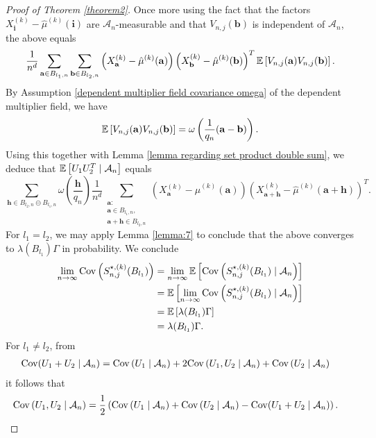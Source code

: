 \begin{proof}[Proof of Theorem \ref{theorem2}]
    Once more using the fact that the factors $X_{\mathbf{i}}^{(k)} - \hat{\mu}^{(k)}(\mathbf{i})$ are $\mathcal{A}_n$-measurable and that $V_{n, j}(\mathbf{b})$ is independent of $\mathcal{A}_n$, the above equals
    \[ \frac{1}{n^d} \sum\limits_{\mathbf{a} \in B_{l_1, n}} \sum\limits_{\mathbf{b} \in B_{l_2, n}} \left( X_\mathbf{a}^{(k)} - \hat{\mu}^{(k)}(\mathbf{a}) \right) \left( X_\mathbf{b}^{(k)} - \hat{\mu}^{(k)}(\mathbf{b}) \right)^T \mathbb{E}\left[ V_{n, j}(\mathbf{a}) V_{n, j}(\mathbf{b})\right]. \]
    By Assumption \eqref{dependent multiplier field covariance omega} of the dependent multiplier field, we have
    \[ \mathbb{E}\left[ V_{n, j}(\mathbf{a}) V_{n, j}(\mathbf{b})\right] = \omega\left(\frac{1}{q_n} (\mathbf{a} - \mathbf{b})\right). \]
    Using this together with Lemma \ref{lemma regarding set product double sum}, we deduce that $\mathbb{E}\left[U_1 U_2^T \mid \mathcal{A}_n\right]$ equals
    \[ \sum\limits_{\mathbf{h} \in B_{l_2, n} \circleddash B_{l_1, n}} \omega\left( \frac{\mathbf{h}}{q_n}\right) \frac{1}{n^d} \sum\limits_{\substack{\mathbf{a}:\\ \mathbf{a} \in B_{l_1, n},\\ \mathbf{a}+\mathbf{h} \in B_{l_2, n}}} \left(X_{\mathbf{a}}^{(k)} - \hat{\mu}^{(k)}(\mathbf{a})\right) \left(X_{\mathbf{a+h}}^{(k)} - \hat{\mu}^{(k)}(\mathbf{a+h})\right)^T. \]
    For $l_1 = l_2$, we may apply Lemma \ref{lemma:7} to conclude that the above converges to $\lambda(B_{l_1}) \Gamma$ in probability.
    We conclude
    \begin{align*}
        \lim\limits_{n \to \infty} \mathrm{Cov}\left( S_{n, j}^{\star, (k)}(B_{l_1}) \right)
        & = \lim\limits_{n \to \infty} \mathbb{E}\left[\mathrm{Cov}\left( S_{n, j}^{\star, (k)}(B_{l_1}) \mid \mathcal{A}_n \right)\right] \\
        & = \mathbb{E}\left[\lim\limits_{n \to \infty} \mathrm{Cov}\left( S_{n, j}^{\star, (k)}(B_{l_1}) \mid \mathcal{A}_n \right)\right] \\
        & = \mathbb{E}\left[\lambda(B_{l_1}) \Gamma\right] \\
        & = \lambda(B_{l_1}) \Gamma.
    \end{align*}
    For $l_1 \neq l_2$, from
    \begin{align*}
        \mathrm{Cov}(U_1 + U_2 \mid \mathcal{A}_n)
        & = \mathrm{Cov}\left( U_1 \mid \mathcal{A}_n \right) + 2 \mathrm{Cov}\left( U_1, U_2 \mid \mathcal{A}_n \right) + \mathrm{Cov}\left( U_2 \mid \mathcal{A}_n \right)
    \end{align*}
    it follows that
    \begin{align*}
        \Cov\left( U_1, U_2 \mid \mathcal{A}_n \right)
        & = \frac{1}{2}\left( \Cov\left( U_1 \mid \mathcal{A}_n \right) + \Cov\left( U_2 \mid \mathcal{A}_n \right) - \Cov(U_1 + U_2 \mid \mathcal{A}_n) \right).

\end{align*}
\end{proof}

